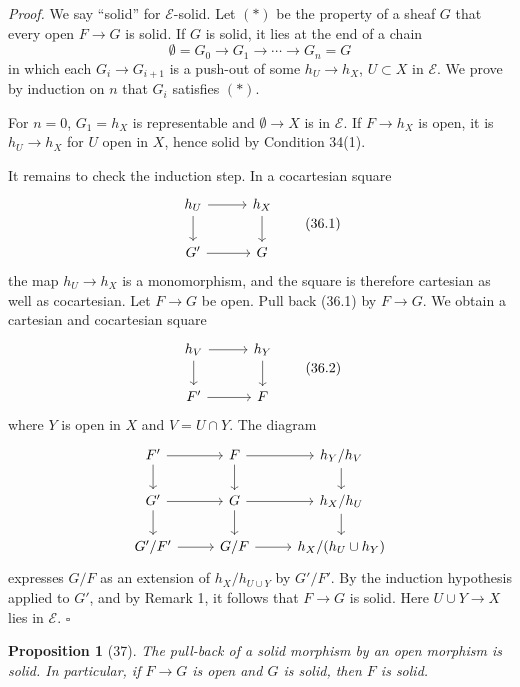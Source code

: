 \documentclass[11pt]{article}
\theoremstyle{deligne}
\newtheorem*{proposition*}{Proposition}
\newenvironment{proofdel}{\noindent\textit{Proof.}}{\hfill$\square$}
\begin{document}
\begin{proofdel}
We say ``solid'' for \(\mathcal E\)-solid. Let \((*)\) be the property of a sheaf \(G\) that every open \(F\to G\) is solid. If \(G\) is solid, it lies at the end of a chain
\[
\emptyset=G_0\to G_1\to\cdots\to G_n=G
\]
in which each \(G_i\to G_{i+1}\) is a push-out of some \(h_U\to h_X\), \(U\subset X\) in \(\mathcal E\). We prove by induction on \(n\) that \(G_i\) satisfies \((*)\).

For \(n=0\), \(G_1=h_X\) is representable and \(\emptyset\to X\) is in \(\mathcal E\). If \(F\to h_X\) is open, it is \(h_U\to h_X\) for \(U\) open in \(X\), hence solid by Condition 34(1).

It remains to check the induction step. In a cocartesian square
\[
\begin{tikzcd}[column sep=2.8em,row sep=1.8em]
h_U \arrow[r] \arrow[d] & h_X \arrow[d]\\
G' \arrow[r] & G
\end{tikzcd}
\tag{36.1}
\]
the map \(h_U\to h_X\) is a monomorphism, and the square is therefore cartesian as well as cocartesian. Let \(F\to G\) be open. Pull back (36.1) by \(F\to G\). We obtain a cartesian and cocartesian square
\[
\begin{tikzcd}[column sep=2.8em,row sep=1.8em]
h_V \arrow[r] \arrow[d] & h_Y \arrow[d]\\
F' \arrow[r] & F
\end{tikzcd}
\tag{36.2}
\]
where \(Y\) is open in \(X\) and \(V=U\cap Y\). The diagram
\[
\begin{tikzcd}[column sep=2.6em,row sep=1.55em]
F' \arrow[r] \arrow[d] & F \arrow[r] \arrow[d] & h_Y/h_V \arrow[d]\\
G' \arrow[r] \arrow[d] & G \arrow[r] \arrow[d] & h_X/h_U \arrow[d]\\
G'/F' \arrow[r] & G/F \arrow[r] & h_X/(h_U\cup h_Y)
\end{tikzcd}
\]
expresses \(G/F\) as an extension of \(h_X/h_{U\cup Y}\) by \(G'/F'\). By the induction hypothesis applied to \(G'\), and by Remark 1, it follows that \(F\to G\) is solid. Here \(U\cup Y\to X\) lies in \(\mathcal E\).
\end{proofdel}

\begin{proposition*}[37]
The pull-back of a solid morphism by an open morphism is solid. In particular, if \(F\to G\) is open and \(G\) is solid, then \(F\) is solid.
\end{proposition*}
\end{document}

